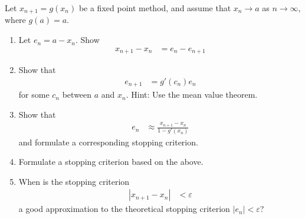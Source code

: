 \documentclass[fleqn, a4paper, 11pt, oneside]{amsart}
\theoremstyle{definition}
\theoremstyle{theorem}
\begin{document}
\begin{question}
	Let $x_{n + 1} = g(x_n)$ be a fixed point method, and assume that $x_n \to a$ as $n \to \infty$, where $g(a) = a$.
	\begin{enumerate}
		\item
			Let $e_n = a - x_n$.
			Show
			\begin{align*}
				x_{n + 1} - x_n & = e_n - e_{n + 1}
			\end{align*}
		\item
			Show that
			\begin{align*}
				e_{n + 1} & = g'(c_n) e_n
			\end{align*}
			for some $c_n$ between $a$ and $x_n$.
			Hint: Use the mean value theorem.
		\item
			Show that
			\begin{align*}
				e_n & \approx \frac{x_{n + 1} - x_n}{1 - g'(x_n)}
			\end{align*}
			and formulate a corresponding stopping criterion.
		\item
			Formulate a stopping criterion based on the above.
		\item
			When is the stopping criterion
			\begin{align*}
				|x_{n + 1} - x_n| & < \varepsilon
			\end{align*}
			a good approximation to the theoretical stopping criterion $|e_n| < \varepsilon$?
	\end{enumerate}
\end{question}
\end{document}

